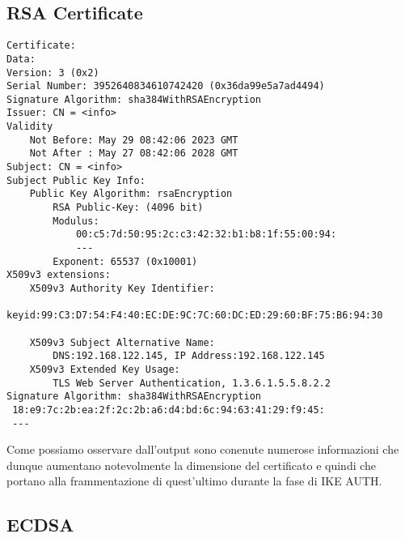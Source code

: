 \documentclass[
10pt, %
a4paper, %
oneside, %
headinclude,footinclude, %
BCOR5mm, %
]{scrartcl}
\begin{document}
\subsection{RSA Certificate}
\begin{lstlisting}
Certificate:
Data:
Version: 3 (0x2)
Serial Number: 3952640834610742420 (0x36da99e5a7ad4494)
Signature Algorithm: sha384WithRSAEncryption
Issuer: CN = <info>
Validity
    Not Before: May 29 08:42:06 2023 GMT
    Not After : May 27 08:42:06 2028 GMT
Subject: CN = <info>
Subject Public Key Info:
    Public Key Algorithm: rsaEncryption
        RSA Public-Key: (4096 bit)
        Modulus:
            00:c5:7d:50:95:2c:c3:42:32:b1:b8:1f:55:00:94:
            ---
        Exponent: 65537 (0x10001)
X509v3 extensions:
    X509v3 Authority Key Identifier: 
        keyid:99:C3:D7:54:F4:40:EC:DE:9C:7C:60:DC:ED:29:60:BF:75:B6:94:30

    X509v3 Subject Alternative Name: 
        DNS:192.168.122.145, IP Address:192.168.122.145
    X509v3 Extended Key Usage: 
        TLS Web Server Authentication, 1.3.6.1.5.5.8.2.2
Signature Algorithm: sha384WithRSAEncryption
 18:e9:7c:2b:ea:2f:2c:2b:a6:d4:bd:6c:94:63:41:29:f9:45:
 ---
\end{lstlisting}
\vspace*{0.2cm}
\noindent
Come possiamo osservare dall'output sono conenute numerose informazioni che dunque aumentano notevolmente 
la dimensione del certificato e quindi che portano alla frammentazione di quest'ultimo durante la fase di IKE AUTH.

\newpage
\subsection{ECDSA}
\end{document}
